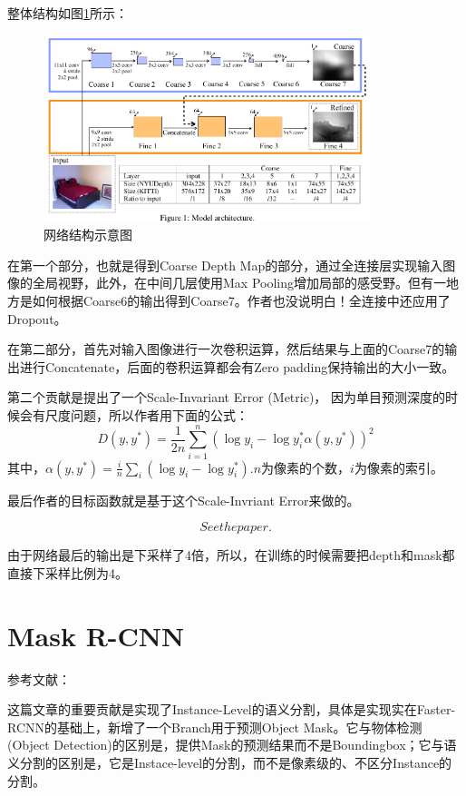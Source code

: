整体结构如图\ref{DepthPrediction2014_0}所示：
\begin{figure}[!hbtp]
\centering
\includegraphics[width=0.85\textwidth]{SemanticSLAM/DepthPrediction2014_0.png}
\caption{网络结构示意图}
\label{DepthPrediction2014_0}
\end{figure}

在第一个部分，也就是得到Coarse Depth Map的部分，通过全连接层实现输入图像的全局视野，此外，在中间几层使用Max Pooling增加局部的感受野。但有一地方是如何根据Coarse6的输出得到Coarse7。作者也没说明白！全连接中还应用了Dropout。

在第二部分，首先对输入图像进行一次卷积运算，然后结果与上面的Coarse7的输出进行Concatenate，后面的卷积运算都会有Zero padding保持输出的大小一致。

第二个贡献是提出了一个Scale-Invariant Error (Metric)， 因为单目预测深度的时候会有尺度问题，所以作者用下面的公式：
\begin{displaymath}
D(y, y^{*})  = \frac{1}{2n}\sum_{i=1}^{n} \left( \log y_i - \log y^{*}_i  \alpha(y, y^{*}) \right)^2
\end{displaymath}
其中，$ \alpha(y, y^{*})= \frac{i}{n}\sum_{i}(\log y_i - \log y^{*}_i)$.$n$为像素的个数，$i$为像素的索引。

最后作者的目标函数就是基于这个Scale-Invriant Error来做的。

\begin{displaymath}
See the paper.
\end{displaymath}

由于网络最后的输出是下采样了4倍，所以，在训练的时候需要把depth和mask都直接下采样比例为4。

\section{Mask R-CNN}

参考文献：

这篇文章的重要贡献是实现了Instance-Level的语义分割，具体是实现实在Faster-RCNN的基础上，新增了一个Branch用于预测Object Mask。它与物体检测(Object Detection)的区别是，提供Mask的预测结果而不是Boundingbox；它与语义分割的区别是，它是Instace-level的分割，而不是像素级的、不区分Instance的分割。

